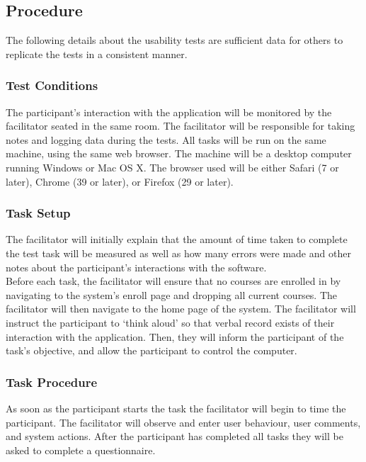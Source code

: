 \documentclass[10pt]{article}
\begin{document}
\begin{multicols}{2}
\subsection*{Procedure}
The following details about the usability tests are sufficient data for others to replicate the tests in a consistent manner.
 
\subsubsection*{Test Conditions}
The participant's interaction with the application will be monitored by the facilitator seated in the same room. The facilitator will be responsible for taking notes and logging data during the tests. All tasks will be run on the same machine, using the same web browser. The machine will be a desktop computer running Windows or Mac OS X. The browser used will be either Safari (7 or later), Chrome (39 or later), or Firefox (29 or later).

\subsubsection*{Task Setup}
The facilitator will initially explain that the amount of time taken to complete the test task will be measured as well as how many errors were made and other notes about the participant's interactions with the software.\\

Before each task, the facilitator will ensure that no courses are enrolled in by navigating to the system's enroll page and dropping all current courses. The facilitator will then navigate to the home page of the system. The facilitator will instruct the participant to `think aloud' so that verbal record exists of their interaction with the application. Then, they will  inform the participant of the task's objective, and allow the participant to control the computer.

\subsubsection*{Task Procedure}
As soon as the participant starts the task the facilitator will begin to time the participant. The facilitator will observe and enter user behaviour, user comments, and system actions. After the participant has completed all tasks they will be asked to complete a questionnaire.


\end{multicols}
\end{document}
